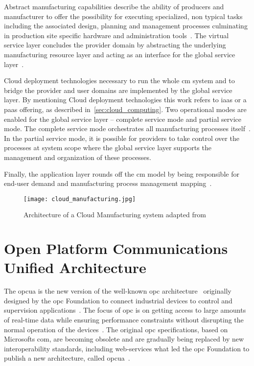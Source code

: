 \documentclass[
a4paper,
twoside,
headsepline,
cleardoublepage=empty,
parskip=half,
draft=false
]{scrbook}
\begin{document}
			Abstract manufacturing capabilities describe the ability of producers and manufacturer to offer the possibility for executing specialized, non typical tasks including the associated design, planning and management processes culminating in production site specific hardware and administration tools~\cite{he2015state}.
			The virtual service layer concludes the provider domain by abstracting the underlying manufacturing resource layer and acting as an interface for the global service layer~\cite{xu2012cloud}.
			
			Cloud deployment technologies necessary to run the whole \gls{cm} system and to bridge the provider and user domains are implemented by the global service layer.
			By mentioning Cloud deployment technologies this work refers to \gls{iaas} or a \gls{paas} offering, as described in~\cref{sec:cloud_computing}.
			Two operational modes are enabled for the global service layer -- complete service mode and partial service mode.
			The complete service mode orchestrates all manufacturing processes itself~\cite{xu2012cloud}.
			In the partial service mode, it is possible for providers to take control over the processes at system scope where the global service layer supports the management and organization of these processes.
			
			Finally, the application layer rounds off the \gls{cm} model by being responsible for end-user demand and manufacturing process management mapping~\cite{xu2012cloud}.
			
			\begin{figure}[htbp]
				\centering
				\texttt{[image: cloud\_manufacturing.jpg]}
				\caption{Architecture of a Cloud Manufacturing system adapted from~\cite{xu2012cloud}}
				\label{fig:cloud_manufacturing}
			\end{figure}

		\section{Open Platform Communications Unified Architecture} \label{sec:opc_ua}

			The \gls{opcua} is the new version of the well-known \gls{opc} architecture~\cite{hadlich2006providing} originally designed by the \gls{opc} Foundation to connect industrial devices to control and supervision applications~\cite{henssen2014online}. 
			The focus of \gls{opc} is on getting access to large amounts of real-time data while ensuring performance constraints without disrupting the normal operation of the devices~\cite{candido2010soa}.
			The original \gls{opc} specifications, based on Microsofts \gls{com}, are becoming obsolete and are gradually being replaced by new interoperability standards, including web-services what led the \gls{opc} Foundation to publish a new architecture, called \gls{opcua}~\cite{hadlich2006providing}.
			
\end{document}
